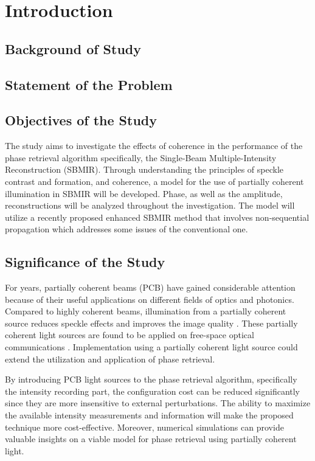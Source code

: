 \chapter{Introduction}
\section{Background of Study}
\hspace{\parindent}


\section{Statement of the Problem}
\hspace{\parindent} 


\section{Objectives of the Study}
\hspace{\parindent} The study aims to investigate the effects of coherence in the performance of the phase retrieval algorithm specifically, the Single-Beam Multiple-Intensity Reconstruction (SBMIR). Through understanding the principles of speckle contrast and formation, and coherence, a model for the use of partially coherent illumination in SBMIR will be developed. Phase, as well as the amplitude, reconstructions will be analyzed throughout the investigation. The model will utilize a recently proposed enhanced SBMIR method that involves non-sequential propagation which addresses some issues of the conventional one. 

\section{Significance of the Study}
\hspace{\parindent}For years, partially coherent beams (PCB) have gained considerable attention because of their useful applications on different fields of optics and photonics. Compared to highly coherent beams, illumination from a partially coherent source reduces speckle effects and improves the image quality \cite{rayleigh}. These partially coherent light sources are found to be applied on free-space optical communications \cite{2020,chang}. Implementation using a partially coherent light source could extend the utilization and application of phase retrieval.

By introducing PCB light sources to the phase retrieval algorithm, specifically the intensity recording part, the configuration cost can be reduced significantly since they are more insensitive to external perturbations. The ability to maximize the available intensity measurements and information will make the proposed technique more cost-effective. Moreover, numerical simulations can provide valuable insights on a viable model for phase retrieval using partially coherent light.

